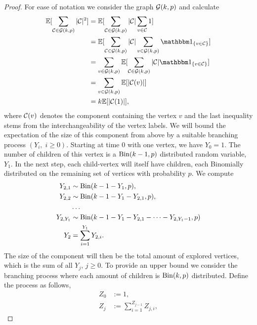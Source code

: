 \begin{proof}
	For ease of notation we consider the graph $\mathcal{G}(k,p)$ and calculate
	\begin{equation} \label{E: P(ExcEvent) 3}
	\begin{aligned}
	\Exp{\sum_{\Ccal \in \Gcal(k, p)} |\Ccal|^2 } 
	&= \Exp{ \sum_{\Ccal \in \Gcal(k, p)} |\Ccal| \sum_{v \in \Ccal} 1} \\
	&= \Exp{ \sum_{\Ccal \in \Gcal(k, p)} |\Ccal| \sum_{v \in \Gcal(k,p)} \Ind{\{v \in \Ccal\}} } \\
	&= \sum_{v \in \Gcal(k,p)} \Exp{ \sum_{\Ccal \in \Gcal(k, p)} |\Ccal| \Ind{\{v \in \Ccal\}} } \\ 
	&= \sum_{v \in \Gcal(k,p)} \Exp{|\Ccal(v)|} \\
	&= k \Exp{|\Ccal(1)|},
	\end{aligned}
	\end{equation}
	where $\mathcal{C}(v)$ denotes the component containing the vertex $v$ and the last inequality stems from the interchangeability of the vertex labels.
	We will bound the expectation of the size of this component from above by a suitable branching process $(Y_i, \; i\geq 0)$.
	Starting at time $0$ with one vertex, we have $Y_0 = 1$.
	The number of children of this vertex is a $\operatorname*{Bin}(k-1,p)$ distributed random variable, $Y_1$.
	In the next step, each child-vertex will itself have children,
	each Binomially distributed on the remaining set of vertices with probability $p$.
	We compute 
	\begin{equation}
	\begin{aligned}
	Y_{2,1} &\sim \operatorname*{Bin}(k-1-Y_1,p), \\ 
	Y_{2,2} &\sim \operatorname*{Bin}(k-1-Y_1-Y_{2,1},p), \\
	&\dots \\
	Y_{2,Y_1} &\sim \operatorname*{Bin}(k-1-Y_1-Y_{2,1}-\dots-Y_{2,Y_1-1},p) \\
	Y_2 &= \sum_{i=1}^{Y_1} Y_{2,i}.
	\end{aligned}
	\end{equation}
	The size of the component will then be the total amount of explored vertices,
	which is the sum of all $Y_j$, $j \geq 0$.
	To provide an upper bound we consider the branching process where each amount of children is $\operatorname*{Bin}(k,p)$ distributed.
	Define the process as follows,
	\begin{equation}
	\begin{aligned}
	Z_0 &:= 1, \\
	Z_j &:= \sum_{i=1}^{Z_{j-1}} Z_{j,i},
	\end{aligned}
	\end{equation}

\end{proof}
